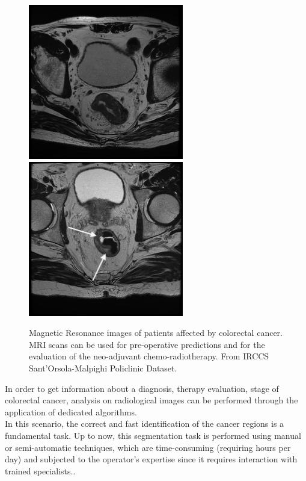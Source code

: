 \documentclass{standalone}
\begin{document}
\begin{figure}[htp]

    \centering
    \includegraphics[width=.49\textwidth]{../images/T2AX_Alta_8.png}\hfill
    \includegraphics[width=.49\textwidth]{../images/T2AX_BO11_5.png}\hfill
    
    \caption{Magnetic Resonance images of patients affected by colorectal cancer. MRI scans can be used for pre-operative predictions and for the evaluation of the neo-adjuvant chemo-radiotherapy. From IRCCS Sant’Orsola-Malpighi Policlinic Dataset.}
    \label{trittico}
    
    \end{figure}
In order to get information about a diagnosis, therapy evaluation, stage of colorectal cancer, analysis on radiological images can be performed through the application of dedicated algorithms.\\
In this scenario, the correct and fast identification of the cancer regions is a fundamental task. 
Up to now, this segmentation task is performed using manual or semi-automatic techniques, which are time-consuming (requiring hours per day) and subjected to the operator's expertise since it requires interaction with trained specialists.\cite{tesicoppola, jovana}.
\end{document}

